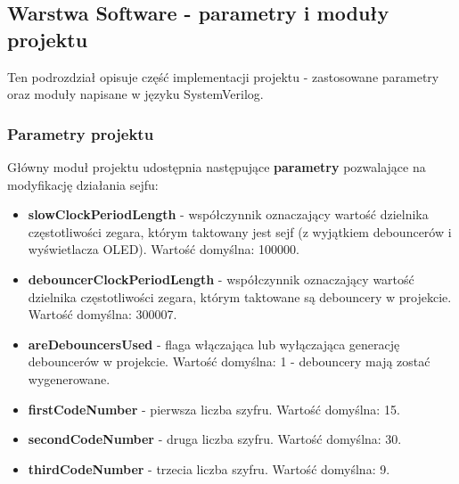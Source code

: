 \documentclass[12pt] {article}
\begin{document}
\subsection{Warstwa Software - parametry i moduły projektu}
Ten podrozdział opisuje część implementacji projektu - zastosowane parametry oraz moduły napisane w języku SystemVerilog.

\subsubsection{Parametry projektu}
Główny moduł projektu udostępnia następujące \textbf{parametry} pozwalające na modyfikację działania sejfu:
\begin{itemize}
\item \textbf{slowClockPeriodLength} - współczynnik oznaczający wartość dzielnika częstotliwości zegara, którym taktowany jest sejf (z wyjątkiem debouncerów i wyświetlacza OLED). Wartość domyślna: 100000.
\item \textbf{debouncerClockPeriodLength} - współczynnik oznaczający wartość dzielnika częstotliwości zegara, którym taktowane są debouncery w projekcie. Wartość domyślna: 300007.
\item \textbf{areDebouncersUsed} - flaga włączająca lub wyłączająca generację debouncerów w projekcie. Wartość domyślna: 1 - debouncery mają zostać wygenerowane.
\item \textbf{firstCodeNumber} - pierwsza liczba szyfru. Wartość domyślna: 15.
\item \textbf{secondCodeNumber} - druga liczba szyfru. Wartość domyślna: 30.
\item \textbf{thirdCodeNumber} - trzecia liczba szyfru. Wartość domyślna: 9.
\end{itemize}
\end{document}

